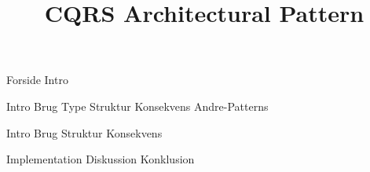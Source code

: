 \documentclass[a4paper,openany]{memoir}
\title{CQRS Architectural Pattern}
\begin{document}
	{Forside}  \newpage
	\tableofcontents\thispagestyle{fancy}  \newpage
	{Intro}  \newpage

	{Intro} \newpage
	{Brug}
	{Type}
	{Struktur}
	{Konsekvens}
	{Andre-Patterns}
	
	{Intro} \newpage
	{Brug}
	{Struktur}
	{Konsekvens}

	{Implementation}
	{Diskussion}
	{Konklusion}
	
	
\end{document}
